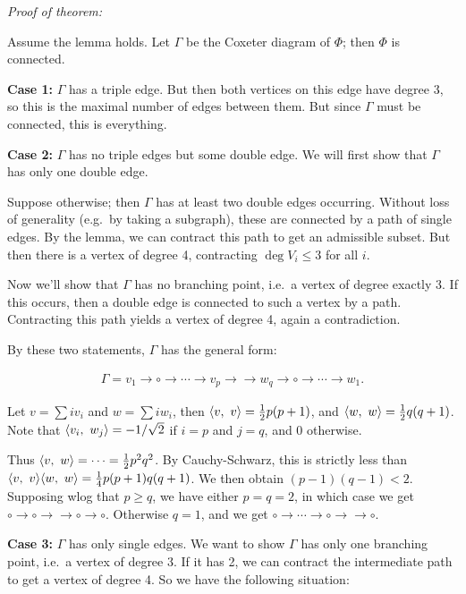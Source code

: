 \emph{Proof of theorem:}

Assume the lemma holds. Let \(\Gamma\) be the Coxeter diagram of
\(\Phi\); then \(\Phi\) is connected.

\textbf{Case 1:} \(\Gamma\) has a triple edge. But then both vertices on
this edge have degree 3, so this is the maximal number of edges between
them. But since \(\Gamma\) must be connected, this is everything.

\textbf{Case 2:} \(\Gamma\) has no triple edges but some double edge. We
will first show that \(\Gamma\) has only one double edge.

Suppose otherwise; then \(\Gamma\) has at least two double edges
occurring. Without loss of generality (e.g.~by taking a subgraph), these
are connected by a path of single edges. By the lemma, we can contract
this path to get an admissible subset. But then there is a vertex of
degree 4, contracting \(\deg V_i \leq 3\) for all \(i\).

Now we'll show that \(\Gamma\) has no branching point, i.e.~a vertex of
degree exactly 3. If this occurs, then a double edge is connected to
such a vertex by a path. Contracting this path yields a vertex of degree
4, again a contradiction.

By these two statements, \(\Gamma\) has the general form:

\begin{align*}
\Gamma = v_1 \to \circ \to \cdots \to v_p \to\to w_q \to \circ \to \cdots \to w_1
.\end{align*}

Let \(v = \sum i v_i\) and \(w = \sum i w_i\), then
\({\left\langle {v},~{v} \right\rangle} = \frac{1}{2} p(p+1)\), and
\({\left\langle {w},~{w} \right\rangle} = \frac 1 2 q(q+1)\). Note that
\({\left\langle {v_i},~{w_j} \right\rangle} = -1/\sqrt 2\) if \(i=p\) and \(j=q\), and 0
otherwise.

Thus \({\left\langle {v},~{w} \right\rangle} = \cdots = \frac 1 2 p^2q^2\). By Cauchy-Schwarz,
this is strictly less than
\({\left\langle {v},~{v} \right\rangle} {\left\langle {w},~{w} \right\rangle} = \frac 1 4 p(p+1)q(q+1)\). We then obtain
\((p-1)(q-1) < 2\). Supposing wlog that \(p \geq q\), we have either
\(p=q=2\), in which case we get
\(\circ \to \circ \to\to \circ \to \circ\). Otherwise \(q=1\), and we
get \(\circ \to \cdots \to \circ \to\to \circ\).

\textbf{Case 3:} \(\Gamma\) has only single edges. We want to show
\(\Gamma\) has only one branching point, i.e.~a vertex of degree 3. If
it has 2, we can contract the intermediate path to get a vertex of
degree 4. So we have the following situation:


